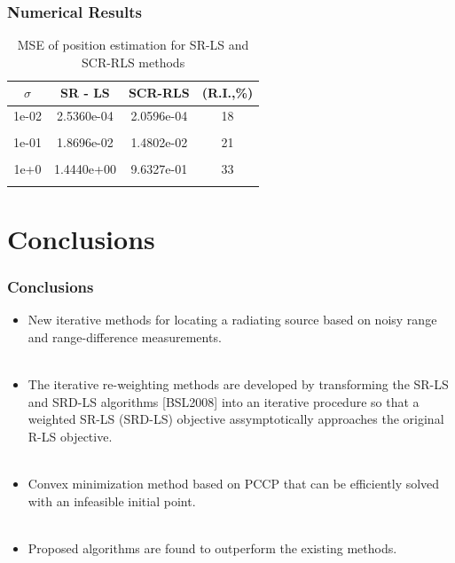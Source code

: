 \documentclass [t] {beamer} %
\begin{document}
\begin{frame} %
\frametitle{Numerical Results}
\begin{table}
\phantom{m}
\caption{MSE of position estimation for SR-LS and SCR-RLS methods}
\begin{tabular}{||c||c|c|c||} 
\hhline{|t:====:t|} 
$\sigma$ & SR - LS & SCR-RLS & (R.I.,\%)  \\ \hline
1e-02&	2.5360e-04 &  2.0596e-04 &  18 \\ &&&\\
1e-01&	1.8696e-02 & 1.4802e-02 &   21 \\ &&&\\
1e+0&	1.4440e+00 &  9.6327e-01 &   33  \\ %
\hhline{|b:====:b|} 
\end{tabular}
\end{table}
\end{frame}



%
\section{Conclusions} 

\begin{frame}
\frametitle{Conclusions} 
\phantom{m}
\begin{itemize}
\item
New iterative methods for locating a radiating source based on noisy range and range-difference measurements.
\\~\\
\item
The iterative re-weighting methods are developed by transforming the SR-LS and SRD-LS algorithms [BSL2008] into an iterative procedure so that a weighted SR-LS (SRD-LS) objective assymptotically
approaches the original R-LS objective.
\\~\\
\item
Convex minimization method based on PCCP that can be efficiently solved with an infeasible initial point.
\\~\\
\item
Proposed algorithms are found to outperform the existing methods.
\end{itemize}
\end{frame}
\end{document}
